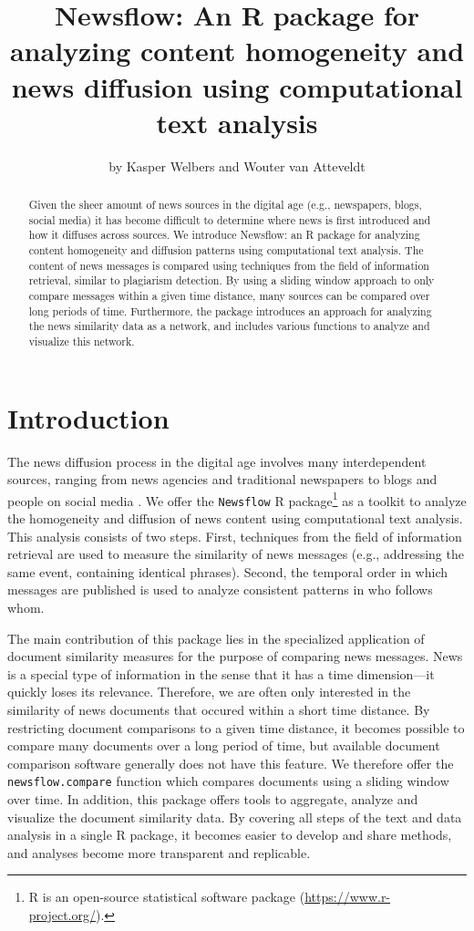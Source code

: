 \documentclass[]{article}
\title{Newsflow: An R package for analyzing content homogeneity and news
diffusion using computational text analysis}
\author{by Kasper Welbers and Wouter van Atteveldt}
\date{}
\let\rmarkdownfootnote\footnote%
\def\footnote{\protect\rmarkdownfootnote}
\begin{document}
\maketitle

\begin{abstract}
Given the sheer amount of news sources in the digital age (e.g.,
newspapers, blogs, social media) it has become difficult to determine
where news is first introduced and how it diffuses across sources. We
introduce Newsflow: an R package for analyzing content homogeneity and
diffusion patterns using computational text analysis. The content of
news messages is compared using techniques from the field of information
retrieval, similar to plagiarism detection. By using a sliding window
approach to only compare messages within a given time distance, many
sources can be compared over long periods of time. Furthermore, the
package introduces an approach for analyzing the news similarity data as
a network, and includes various functions to analyze and visualize this
network.
\end{abstract}

\section{Introduction}\label{introduction}

The news diffusion process in the digital age involves many
interdependent sources, ranging from news agencies and traditional
newspapers to blogs and people on social media
\citep{meraz11, paterson05, pew10}. We offer the \texttt{Newsflow} R
package\footnote{R is an open-source statistical software package
  (\url{https://www.r-project.org/}).} as a toolkit to analyze the
homogeneity and diffusion of news content using computational text
analysis. This analysis consists of two steps. First, techniques from
the field of information retrieval are used to measure the similarity of
news messages (e.g., addressing the same event, containing identical
phrases). Second, the temporal order in which messages are published is
used to analyze consistent patterns in who follows whom.

The main contribution of this package lies in the specialized
application of document similarity measures for the purpose of comparing
news messages. News is a special type of information in the sense that
it has a time dimension---it quickly loses its relevance. Therefore, we
are often only interested in the similarity of news documents that
occured within a short time distance. By restricting document
comparisons to a given time distance, it becomes possible to compare
many documents over a long period of time, but available document
comparison software generally does not have this feature. We therefore
offer the \texttt{newsflow.compare} function which compares documents
using a sliding window over time. In addition, this package offers tools
to aggregate, analyze and visualize the document similarity data. By
covering all steps of the text and data analysis in a single R package,
it becomes easier to develop and share methods, and analyses become more
transparent and replicable.
\end{document}
